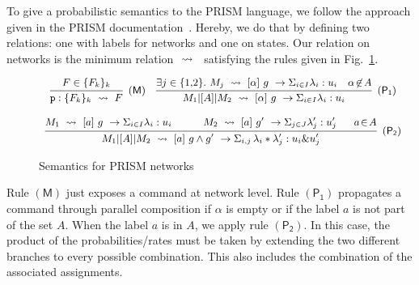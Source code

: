  To give a probabilistic semantics to the PRISM
language, we follow the approach given in the PRISM
documentation~\cite{PRISMdoc}.  Hereby, we do that by defining two
relations: one with labels for networks and one on states. Our
relation on networks is the minimum relation $\ \stackrel{}{\rightsquigarrow}\ {}$
satisfying the rules given in Fig.~\ref{fig:semantics}.
% 
\begin{figure}[h]
  \begin{displaymath}\small
    \begin{array}{ccc}
      \infer[\mathsf{(M)}]
      { {\role{p}:\{F_k\}_k} \prismred{} F
      }
      {
      F\in\{F_k\}_k
      }
      \quad
      \infer[\mathsf{(P_1)}]
      {M_1\ppp A M_2\prismred{}\command {\alpha}g\lambda u
      }
      {
      \exists j\in\{1,\!2\}.\ 
      M_j\prismred{} \command {\alpha}g\lambda u
      & \alpha\!\not\in\! A
        }
      \\\\
      \infer[\mathsf{(P_2)}]
      {M_1\ppp A M_2\prismred{}
      \commandBase a{g\land g'}
      {\Sigma_{i,j}\,\lambda_i*\lambda'_j}: {u_i\& u'_j} 
      }
      {
      M_1\prismred{}\command {a}g\lambda u
      \quad&\quad 
        M_2\prismred{}\commandBase {a} {g'} \Sigma_{j\in J}\lambda'_j: u'_j
      \ &\
             a\!\in\! A}
    \end{array}
  \end{displaymath}
  \caption{Semantics for PRISM networks} 
  \label{fig:semantics}
\end{figure}
Rule $\mathsf{(M)}$ just exposes a command at network level. Rule
$\mathsf{(P_1)}$ propagates a command through parallel composition if
$\alpha$ is empty or if the label $a$ is not part of the set $A$. When
the label $a$ is in $A$, we apply rule $\mathsf{(P_2)}$. In this case,
the product of the probabilities/rates must be taken by extending the
two different branches to every possible combination. This also
includes the combination of the associated assignments.

